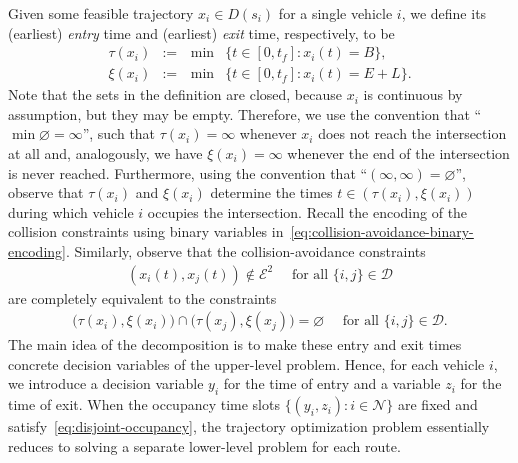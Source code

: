 \documentclass[a4paper]{report}
\theoremstyle{definition}
\theoremstyle{plain}
\begin{document}
Given some feasible trajectory $x_{i} \in D(s_{i})$ for a single vehicle $i$, we
define its (earliest) \emph{entry} time and (earliest) \emph{exit} time,
respectively, to be
%
\begin{subequations}
\begin{alignat}{2}
  \tau(x_{i}) &:=& \, \min &\{ t \in [0, t_{f}] : x_{i}(t) = B \} , \\
  \xi(x_{i}) &:=& \, \min &\{ t \in [0, t_{f}] : x_{i}(t) = E + L \} .
\end{alignat}
\end{subequations}
Note that the sets in the definition are closed, because $x_{i}$ is continuous
by assumption, but they may be empty. Therefore, we use the convention that
``$\min \varnothing = \infty$'', such that $\tau(x_{i}) = \infty$ whenever $x_{i}$ does not reach the
intersection at all and, analogously, we have $\xi(x_{i}) = \infty$ whenever the end of
the intersection is never reached. Furthermore, using the convention that
``$(\infty, \infty) = \varnothing$'', observe that $\tau(x_{i})$ and $\xi(x_{i})$ determine the times $t \in (\tau(x_{i}), \xi(x_{i}))$
during which vehicle $i$ occupies the intersection.
%
Recall the encoding of the collision constraints using binary variables
in~\eqref{eq:collision-avoidance-binary-encoding}.
%
Similarly, observe that the
collision-avoidance constraints
\begin{align}
  (x_{i}(t), x_{j}(t)) \notin \mathcal{E}^{2} \quad \text{ for all } \{i,j\} \in \mathcal{D}
\end{align}
are completely equivalent to the constraints
\begin{align}\label{eq:disjoint-occupancy}
  \big(\tau(x_{i}), \xi(x_{i}) \big) \cap \big(\tau(x_{j}), \xi(x_{j})\big) = \varnothing \quad \text{ for all } \{i,j\} \in \mathcal{D} .
\end{align}
%
The main idea of the decomposition is to make these entry and exit times
concrete decision variables of the upper-level problem.
%
Hence, for each vehicle $i$, we introduce a decision variable $y_{i}$ for the
time of entry and a variable $z_{i}$ for the time of exit.
%
When the occupancy time slots $\{(y_{i}, z_{i}) : i \in \mathcal{N}\}$ are fixed
and satisfy~\eqref{eq:disjoint-occupancy}, the trajectory optimization problem
essentially reduces to solving a separate lower-level problem for each route.
\end{document}
